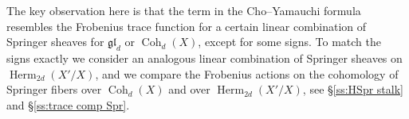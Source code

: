 \documentclass[reqno]{amsart}
\numberwithin{equation}{section}
\newcommand{\wt}[1]{\widetilde{#1}}
\newcommand{\Z}{\mathbf{Z}}
\DeclareMathOperator{\Herm}{Herm}
\DeclareMathOperator{\Coh}{Coh}
\DeclareMathOperator{\Spr}{Spr}
\newcommand\gl{\mathfrak{gl}}
\newcommand\so{\mathfrak{so}}
\newcommand\frg{\mathfrak{g}}
\theoremstyle{remark}
\numberwithin{equation}{section}
\begin{document}

The key observation here is that the term in the Cho--Yamauchi formula resembles the Frobenius trace function for a certain linear combination of Springer sheaves for $\gl_{d}$ or $\Coh_{d}(X)$, except for some signs. To match the signs exactly we consider an analogous linear combination of Springer sheaves on $\Herm_{2d}(X'/X)$, and we compare the Frobenius actions on the cohomology of Springer fibers over $\Coh_{d}(X)$ and over $\Herm_{2d}(X'/X)$, see \S\ref{ss:HSpr stalk} and \S\ref{ss:trace comp Spr}.
\end{document}
